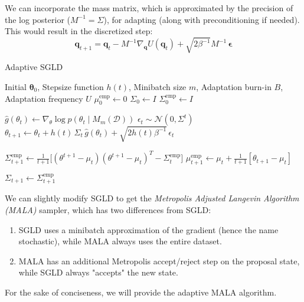 \documentclass{article}
\theoremstyle{remark}
\theoremstyle{definition}
\begin{document}
We can incorporate the mass matrix, which is approximated by the precision of the log posterior ($M^{-1} = \Sigma$), for adapting (along with preconditioning if needed). This would result in the discretized step: 
\[\mathbf{q}_{t+1} = \mathbf{q}_t - M^{-1} \nabla_{\mathbf{q}} U(\mathbf{q}_t) + \sqrt{2 \beta^{-1}} M^{-1} \, \boldsymbol{\epsilon}\]

\begin{algorithm}
\caption{Adaptive SGLD}\label{alg:cap}
\begin{algorithmic}

\Require Initial $\boldsymbol{\theta}_0$, Stepsize function $h(t)$, Minibatch size $m$, Adaptation burn-in $B$, Adaptation frequency $U$
\State $\mu_0^{\mathrm{emp}} \gets 0$
\State $\Sigma_0 \gets I$
\State $\Sigma_0^{\mathrm{emp}} \gets I$

    \State $\hat{g}(\theta_t) \gets \nabla_\theta \log{p(\theta_t \mid M_m(\mathcal{D}))}$
    \State $\epsilon_t \sim \mathcal{N}(0, \Sigma^t)$
    \State $\theta_{t+1} \gets \theta_t + h(t) \, \Sigma_t \, \hat{g}(\theta_t) + \sqrt{2 h(t) \beta^{-1}} \, \epsilon_t$
    
    \State $\Sigma^\mathrm{emp}_{t+1} \gets \frac{1}{t+1} \big[(\theta^{t+1} - \mu_t) (\theta^{t+1} - \mu_t)^T - \Sigma^\mathrm{emp}_t \big]$
    \State $\mu_{t+1}^\mathrm{emp} \gets \mu_t + \frac{1}{t+1} [ \theta_{t+1} - \mu_t ]$
    
        \State $\Sigma_{t+1} \gets \Sigma_{t+1}^{\mathrm{emp}}$
    \EndIf
\EndFor

\end{algorithmic}
\end{algorithm}

We can slightly modify SGLD to get the \textit{Metropolis Adjusted Langevin Algorithm (MALA)} sampler, which has two differences from SGLD: 
\begin{enumerate}
    \item SGLD uses a minibatch approximation of the gradient (hence the name stochastic), while MALA always uses the entire dataset.
    \item MALA has an additional Metropolis accept/reject step on the proposal state, while SGLD always "accepts" the new state.
\end{enumerate}
For the sake of conciseness, we will provide the adaptive MALA algorithm. 
\end{document}
